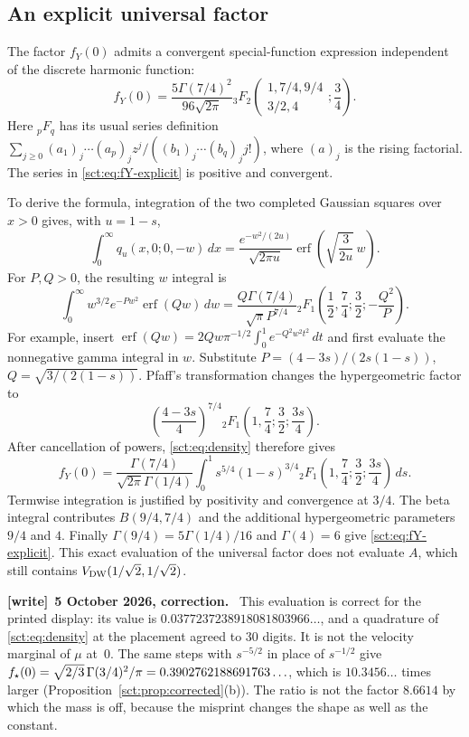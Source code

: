 \documentclass[11pt,letterpaper]{article}
\theoremstyle{definition}\newtheorem{remark}[theorem]{Remark}
\newcommand{\fY}{f_Y}\newcommand{\code}[1]{\texttt{#1}}
\newenvironment{writenote}[1][]{\par\smallskip\begingroup\small
 \noindent\textbf{[write]}\if\relax\detokenize{#1}\relax\else~\textbf{#1.}\fi\ }%
 {\par\endgroup\smallskip}
\begin{document}
\subsection{An explicit universal factor}
The factor $\fY(0)$ admits a convergent special-function expression independent
of the discrete harmonic function:
\begin{equation}\label{sct:eq:fY-explicit}
 \fY(0)=\frac{5\Gamma(7/4)^2}{96\sqrt{2\pi}}
 {}_3F_2\left(\begin{matrix}1,7/4,9/4\\3/2,4\end{matrix};\frac34\right).
\end{equation}
Here ${}_pF_q$ has its usual series definition
$\sum_{j\ge0}(a_1)_j\cdots(a_p)_jz^j/
((b_1)_j\cdots(b_q)_j j!)$, where $(a)_j$ is the rising factorial.
The series in \eqref{sct:eq:fY-explicit} is positive and convergent.

To derive the formula, integration of the two completed Gaussian squares
over $x>0$ gives, with $u=1-s$,
\[
 \int_0^\infty q_u(x,0;0,-w)\,dx
 =\frac{e^{-w^2/(2u)}}{\sqrt{2\pi u}}
       \operatorname{erf}\!\left(\sqrt{\frac3{2u}}\,w\right).
\]
For $P,Q>0$, the resulting $w$ integral is
\begin{equation}\label{sct:eq:erf-integral}
 \int_0^\infty w^{3/2}e^{-Pw^2}\operatorname{erf}(Qw)\,dw
 =\frac{Q\Gamma(7/4)}{\sqrt\pi P^{7/4}}
 {}_2F_1\left(\frac12,\frac74;\frac32;-\frac{Q^2}{P}\right).
\end{equation}
For example, insert
$\operatorname{erf}(Qw)=2Qw\pi^{-1/2}\int_0^1e^{-Q^2w^2t^2}\,dt$
and first evaluate the nonnegative gamma integral in $w$.
Substitute $P=(4-3s)/(2s(1-s))$, $Q=\sqrt{3/(2(1-s))}$.
Pfaff's transformation changes the hypergeometric factor to
\[
 \left(\frac{4-3s}{4}\right)^{7/4}
 {}_2F_1\left(1,\frac74;\frac32;\frac{3s}{4}\right).
\]
After cancellation of powers, \eqref{sct:eq:density} therefore gives
\[
 \fY(0)=\frac{\Gamma(7/4)}{\sqrt{2\pi}\Gamma(1/4)}
 \int_0^1s^{5/4}(1-s)^{3/4}
 {}_2F_1\left(1,\frac74;\frac32;\frac{3s}{4}\right)\,ds.
\]
Termwise integration is justified by positivity and convergence at $3/4$.
The beta integral contributes $B(9/4,7/4)$ and the additional hypergeometric
parameters $9/4$ and $4$. Finally
$\Gamma(9/4)=5\Gamma(1/4)/16$ and $\Gamma(4)=6$ give
\eqref{sct:eq:fY-explicit}. This exact evaluation of the universal factor does
not evaluate $A$, which still contains $V_{\mathrm{DW}}(1/\sqrt2,1/\sqrt2)$.
\begin{writenote}[5 October 2026, correction]
This evaluation is correct for the printed display: its value is $0.0377237238918081803966\ldots$, and a quadrature of \eqref{sct:eq:density} at the placement agreed to 30 digits. It is not the velocity marginal of $\mu$ at~$0$. The same steps with $s^{-5/2}$ in place of $s^{-1/2}$ give $f_\star(0)=\sqrt{2/3}\,\Gamma(3/4)^2/\pi=0.3902762188691763\ldots$, which is $10.3456\ldots$ times larger (Proposition~\ref{sct:prop:corrected}(b)). The ratio is not the factor $8.6614$ by which the mass is off, because the misprint changes the shape as well as the constant.
\end{writenote}
\end{document}
